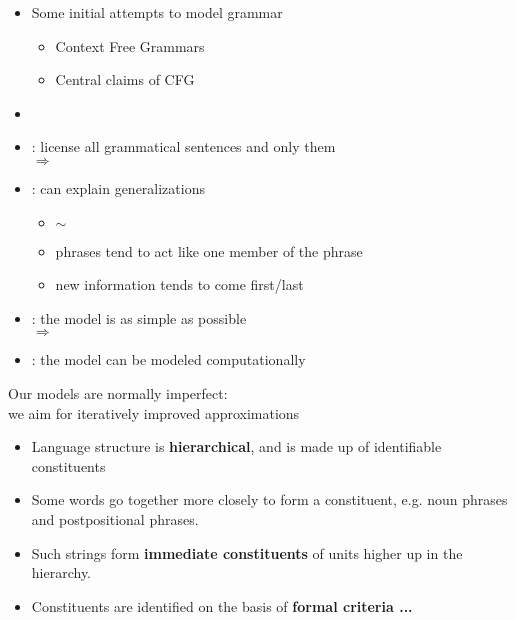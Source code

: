 \documentclass[a4paper,landscape,headrule,footrule]{foils}
\newenvironment{block}[1]%
  {%
    \par\medskip
    \noindent\textbf{#1}\par}%
  {%
    \medskip
  }
\begin{document}
\maketitle

%


\begin{itemize}
\item Some initial attempts to model grammar
  \begin{itemize}
  \item Context Free Grammars
  \item Central claims of CFG
  \end{itemize}
\item 
\end{itemize}



\begin{itemize}
\item {}: license all grammatical sentences and only them
\\ $\Rightarrow$ 
\item {}: can explain generalizations
  \begin{itemize}
  \item  {} $\sim$  
  \item phrases tend to act like one member of the phrase 
  \item new information tends to come first/last 
  \end{itemize}
\item {}: the model is as simple as possible 
\\ $\Rightarrow$  
\item {}: the model can be modeled computationally
\end{itemize}

\begin{center}
  Our models are normally imperfect: \\
we aim for iteratively improved approximations
\end{center}


\begin{block}{}
  \begin{itemize}
  \item
    Language structure is \textbf{hierarchical}, and is made up of identifiable constituents
  \item
    Some words go together more closely to form a constituent, e.g. noun phrases and postpositional phrases.  
  \item
   Such strings form \textbf{immediate constituents} of units higher up in the hierarchy.
\item
    Constituents are identified on the basis of \textbf{formal criteria ...}
  \end{itemize}
\end{block}
\end{document}
